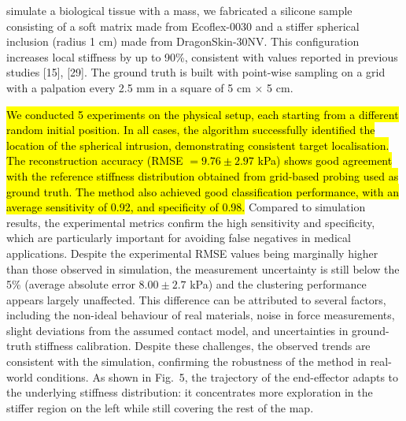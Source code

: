 \documentclass[11pt]{article}
\begin{document}
simulate a biological tissue with a mass, we fabricated a silicone
sample consisting of a soft matrix made from Ecoflex-0030 and a
stiffer spherical inclusion (radius 1 cm) made from DragonSkin-30NV.
This configuration increases local stiffness by up to 90\%,
consistent with values reported in previous studies [15], [29]. The
ground truth is built with point-wise sampling on a grid with a
palpation every 2.5 mm in a square of 5 cm $\times$ 5 cm.

\hl{We conducted 5 experiments on the physical setup, each starting from
a different random initial position. In all cases, the algorithm
successfully identified the location of the spherical intrusion,
demonstrating consistent target localisation. The reconstruction
accuracy (RMSE $= 9.76 \pm 2.97$ kPa) shows good agreement with the
reference stiffness distribution obtained from grid-based probing
used as ground truth. The method also achieved good classification
performance, with an average sensitivity of 0.92, and specificity of
0.98.} Compared to simulation results, the experimental metrics
confirm the high sensitivity and specificity, which are particularly
important for avoiding false negatives in medical applications.
Despite the experimental RMSE values being marginally higher than
those observed in simulation, the measurement uncertainty is still
below the 5\% (average absolute error $8.00 \pm 2.7$ kPa) and the
clustering performance appears largely unaffected. This difference
can be attributed to several factors, including the non-ideal
behaviour of real materials, noise in force measurements, slight
deviations from the assumed contact model, and uncertainties in
ground-truth stiffness calibration. Despite these challenges, the
observed trends are consistent with the simulation, confirming the
robustness of the method in real-world conditions. As shown in
Fig.~5, the trajectory of the end-effector adapts to the underlying
stiffness distribution: it concentrates more exploration in the
stiffer region on the left while still covering the rest of the map.
\end{document}
